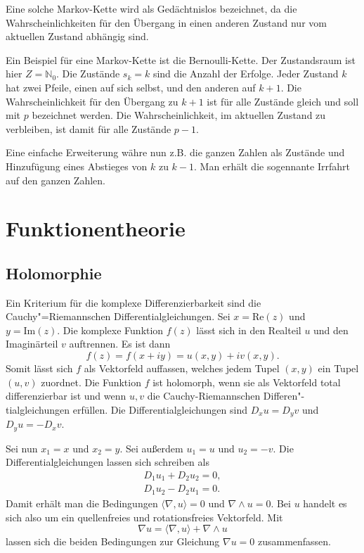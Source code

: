 \documentclass[a4paper,10pt,fleqn,twocolumn,twoside]{article}
\begin{document}
Eine solche Markov-Kette wird als Gedächtnislos bezeichnet, da
die Wahrscheinlichkeiten für den Übergang in einen anderen Zustand
nur vom aktuellen Zustand abhängig sind.

Ein Beispiel für eine Markov-Kette ist die Bernoulli-Kette.
Der Zustandsraum ist hier \(Z=\mathbb{N}_0\). Die Zustände \(s_k=k\)
sind die Anzahl der Erfolge. Jeder Zustand \(k\) hat zwei Pfeile,
einen auf sich selbst, und den anderen auf \(k+1\). Die
Wahrscheinlichkeit für den Übergang zu \(k+1\) ist für alle Zustände
gleich und soll mit \(p\) bezeichnet werden. Die Wahrscheinlichkeit,
im aktuellen Zustand zu verbleiben, ist damit für alle
Zustände \(p-1\).

Eine einfache Erweiterung währe nun z.B. die ganzen Zahlen als
Zustände und Hinzufügung eines Abstieges von \(k\) zu \(k-1\).
Man erhält die sogennante Irrfahrt auf den ganzen Zahlen.


\newpage
\section{Funktionentheorie}
\subsection{Holomorphie}

Ein Kriterium für die komplexe Differenzierbarkeit sind die
Cauchy"=Riemannschen Differentialgleichungen. Sei \(x=\mathrm{Re}(z)\)
und \(y=\mathrm{Im}(z)\). Die komplexe Funktion \(f(z)\) lässt sich
in den Realteil \(u\) und den Imaginärteil \(v\) auftrennen. Es ist
dann
\[f(z) = f(x+iy) = u(x,y)+iv(x,y).\]
Somit lässt sich \(f\) als Vektorfeld auffassen, welches jedem Tupel
\((x,y)\) ein Tupel \((u,v)\) zuordnet. Die Funktion \(f\) ist
holomorph, wenn sie als Vektorfeld total differenzierbar ist und
wenn \(u,v\) die Cauchy-Riemannschen Differen"-tialgleichungen
erfüllen. Die Differentialgleichungen sind \(D_x u=D_y v\) und
\(D_y u = -D_x v\).

Sei nun \(x_1=x\) und \(x_2=y\). Sei außerdem \(u_1=u\)
und \(u_2=-v\). Die Differentialgleichungen lassen sich schreiben als
\begin{gather*}
D_1u_1+D_2u_2=0,\\
D_1u_2-D_2u_1=0.
\end{gather*}
Damit erhält man die Bedingungen \(\langle\nabla,u\rangle=0\) und
\(\nabla\wedge u=0\). Bei \(u\) handelt es sich also um ein
quellenfreies und rotationsfreies Vektorfeld. Mit
\[\nabla u = \langle\nabla, u\rangle+\nabla\wedge u\]
lassen sich die beiden Bedingungen zur Gleichung \(\nabla u=0\)
zusammenfassen.
\end{document}
